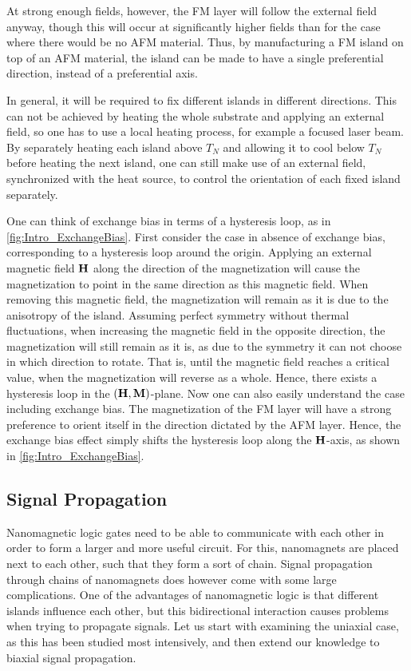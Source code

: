 \documentclass[11pt,a4paper,english]{article}
\begin{document}
At strong enough fields, however, the FM layer will follow the external field anyway, though this will occur at significantly higher fields than for the case where there would be no AFM material. Thus, by manufacturing a FM island on top of an AFM material, the island can be made to have a single preferential direction, instead of a preferential axis. \par
In general, it will be required to fix different islands in different directions. This can not be achieved by heating the whole substrate and applying an external field, so one has to use a local heating process, for example a focused laser beam. By separately heating each island above $T_N$ and allowing it to cool below $T_N$ before heating the next island, one can still make use of an external field, synchronized with the heat source, to control the orientation of each fixed island separately. \par
One can think of exchange bias in terms of a hysteresis loop, as in \cref{fig:Intro_ExchangeBias}. First consider the case in absence of exchange bias, corresponding to a hysteresis loop around the origin. Applying an external magnetic field $\vb{H}$ along the direction of the magnetization will cause the magnetization to point in the same direction as this magnetic field. When removing this magnetic field, the magnetization will remain as it is due to the anisotropy of the island. Assuming perfect symmetry without thermal fluctuations, when increasing the magnetic field in the opposite direction, the magnetization will still remain as it is, as due to the symmetry it can not choose in which direction to rotate. That is, until the magnetic field reaches a critical value, when the magnetization will reverse as a whole. Hence, there exists a hysteresis loop in the $(\vb{H}, \vb{M})$-plane. Now one can also easily understand the case including exchange bias. The magnetization of the FM layer will have a strong preference to orient itself in the direction dictated by the AFM layer. Hence, the exchange bias effect simply shifts the hysteresis loop along the $\vb{H}$-axis, as shown in \cref{fig:Intro_ExchangeBias}.

\subsection{Signal Propagation}
Nanomagnetic logic gates need to be able to communicate with each other in order to form a larger and more useful circuit. For this, nanomagnets are placed next to each other, such that they form a sort of chain. Signal propagation through chains of nanomagnets does however come with some large complications. One of the advantages of nanomagnetic logic is that different islands influence each other, but this bidirectional interaction causes problems when trying to propagate signals. Let us start with examining the uniaxial case, as this has been studied most intensively, and then extend our knowledge to biaxial signal propagation.
\end{document}
